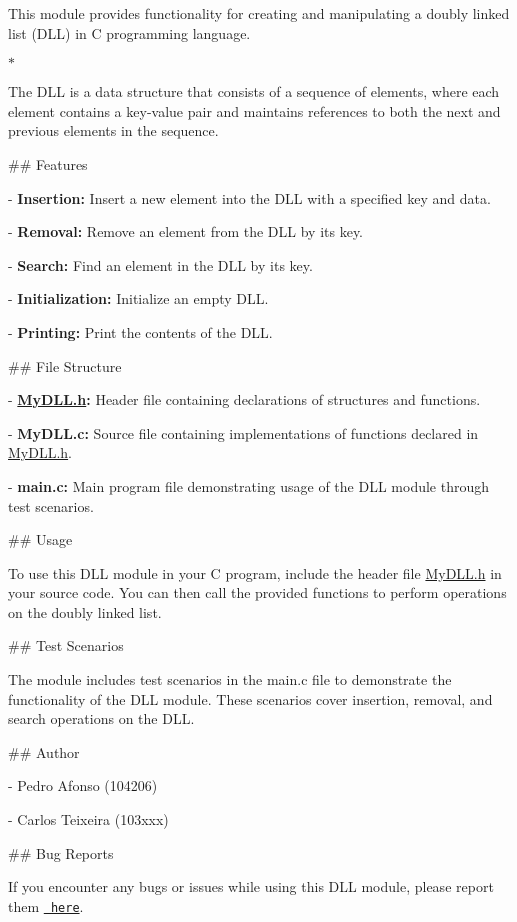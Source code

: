 This module provides functionality for creating and manipulating a doubly linked list (DLL) in C programming language.
\begin{DoxyItemize}
\item 
\begin{DoxyItemize}
\item $\ast$
\item The DLL is a data structure that consists of a sequence of elements, where each element contains a key-\/value pair and maintains references to both the next and previous elements in the sequence.
\item 
\item \#\# Features
\item -\/ {\bfseries{Insertion\+:}} Insert a new element into the DLL with a specified key and data.
\item -\/ {\bfseries{Removal\+:}} Remove an element from the DLL by its key.
\item -\/ {\bfseries{Search\+:}} Find an element in the DLL by its key.
\item -\/ {\bfseries{Initialization\+:}} Initialize an empty DLL.
\item -\/ {\bfseries{Printing\+:}} Print the contents of the DLL.
\item 
\item \#\# File Structure
\item -\/ {\bfseries{\mbox{\hyperlink{MyDLL_8h}{My\+DLL.\+h}}\+:}} Header file containing declarations of structures and functions.
\item -\/ {\bfseries{My\+DLL.\+c\+:}} Source file containing implementations of functions declared in \mbox{\hyperlink{MyDLL_8h}{My\+DLL.\+h}}.
\item -\/ {\bfseries{main.\+c\+:}} Main program file demonstrating usage of the DLL module through test scenarios.
\item 
\item \#\# Usage
\item To use this DLL module in your C program, include the header file {\ttfamily \mbox{\hyperlink{MyDLL_8h}{My\+DLL.\+h}}} in your source code. You can then call the provided functions to perform operations on the doubly linked list.
\item 
\item \#\# Test Scenarios
\item The module includes test scenarios in the {\ttfamily main.\+c} file to demonstrate the functionality of the DLL module. These scenarios cover insertion, removal, and search operations on the DLL.
\item 
\item \#\# Author
\item -\/ Pedro Afonso (104206)
\item -\/ Carlos Teixeira (103xxx)
\item 
\item \#\# Bug Reports
\item If you encounter any bugs or issues while using this DLL module, please report them \href{https://github.com/pisko19/SETR/issues}{\texttt{ here}}.
\item 
\end{DoxyItemize}
\end{DoxyItemize}